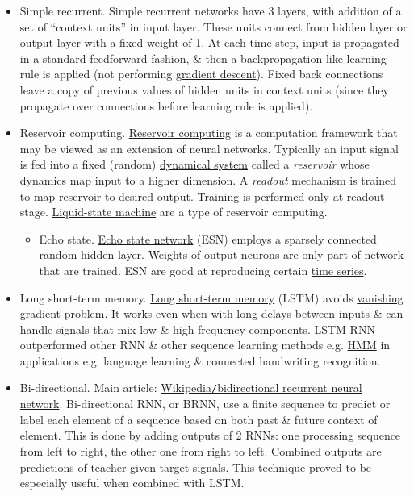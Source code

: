 \documentclass{article}
\begin{document}
\begin{itemize}
\begin{itemize}
	\end{itemize}
	\item {\sf Simple recurrent.} Simple recurrent networks have 3 layers, with addition of a set of ``context units'' in input layer. These units connect from hidden layer or output layer with a fixed weight of 1. At each time step, input is propagated in a standard feedforward fashion, \& then a backpropagation-like learning rule is applied (not performing \href{https://en.wikipedia.org/wiki/Gradient_descent}{gradient descent}). Fixed back connections leave a copy of previous values of hidden units in context units (since they propagate over connections before learning rule is applied).
	\item {\sf Reservoir computing.} \href{https://en.wikipedia.org/wiki/Reservoir_computing}{Reservoir computing} is a computation framework that may be viewed as an extension of neural networks. Typically an input signal is fed into a fixed (random) \href{https://en.wikipedia.org/wiki/Dynamical_system}{dynamical system} called a {\it reservoir} whose dynamics map input to a higher dimension. A {\it readout} mechanism is trained to map reservoir to desired output. Training is performed only at readout stage. \href{https://en.wikipedia.org/wiki/Liquid-state_machine}{Liquid-state machine} are a type of reservoir computing.
	\begin{itemize}
		\item {\sf Echo state.} \href{https://en.wikipedia.org/wiki/Echo_state_network}{Echo state network} (ESN) employs a sparsely connected random hidden layer. Weights of output neurons are only part of network that are trained. ESN are good at reproducing certain \href{https://en.wikipedia.org/wiki/Time_series}{time series}.
	\end{itemize}
	\item {\sf Long short-term memory.} \href{https://en.wikipedia.org/wiki/Long_short-term_memory}{Long short-term memory} (LSTM) avoids \href{https://en.wikipedia.org/wiki/Vanishing_gradient_problem}{vanishing gradient problem}. It works even when with long delays between inputs \& can handle signals that mix low \& high frequency components. LSTM RNN outperformed other RNN \& other sequence learning methods e.g. \href{https://en.wikipedia.org/wiki/Hidden_Markov_model}{HMM} in applications e.g. language learning \& connected handwriting recognition.
	\item {\sf Bi-directional.} Main article: \href{https://en.wikipedia.org/wiki/Bidirectional_recurrent_neural_network}{Wikipedia{\tt/}bidirectional recurrent neural network}. Bi-directional RNN, or BRNN, use a finite sequence to predict or label each element of a sequence based on both past \& future context of element. This is done by adding outputs of 2 RNNs: one processing sequence from left to right, the other one from right to left. Combined outputs are predictions of teacher-given target signals. This technique proved to be especially useful when combined with LSTM.

\end{itemize}
\end{document}
